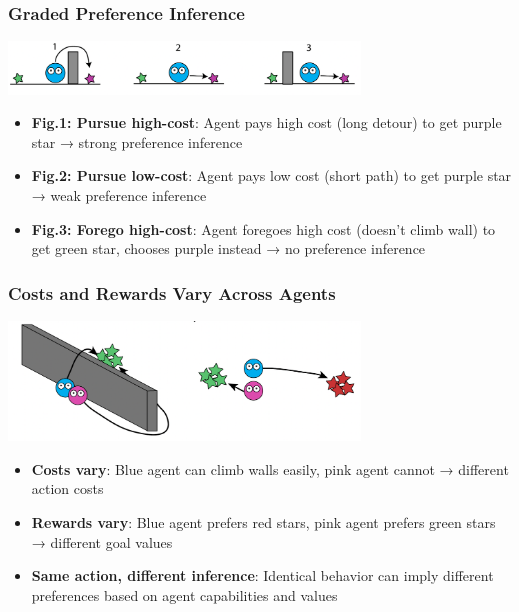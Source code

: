 \documentclass{beamer}
\begin{document}
\begin{frame}
\frametitle{Graded Preference Inference}
\begin{center}
\includegraphics[width=0.7\textwidth]{utility3.png}
\end{center}

\vspace{0.3cm}
\begin{itemize}
    \item \textbf{Fig.1: Pursue high-cost}: Agent pays high cost (long detour) to get purple star → strong preference inference
    \pause
    \item \textbf{Fig.2: Pursue low-cost}: Agent pays low cost (short path) to get purple star → weak preference inference
    \pause
    \item \textbf{Fig.3: Forego high-cost}: Agent foregoes high cost (doesn't climb wall) to get green star, chooses purple instead → no preference inference
\end{itemize}
\end{frame}

\begin{frame}
\frametitle{Costs and Rewards Vary Across Agents}
\begin{center}
\includegraphics[width=0.7\textwidth]{utility4.png}
\end{center}

\vspace{0.3cm}
\begin{itemize}
    \item \textbf{Costs vary}: Blue agent can climb walls easily, pink agent cannot → different action costs
    \pause
    \item \textbf{Rewards vary}: Blue agent prefers red stars, pink agent prefers green stars → different goal values
    \pause
    \item \textbf{Same action, different inference}: Identical behavior can imply different preferences based on agent capabilities and values
\end{itemize}
\end{frame}
\end{document}
